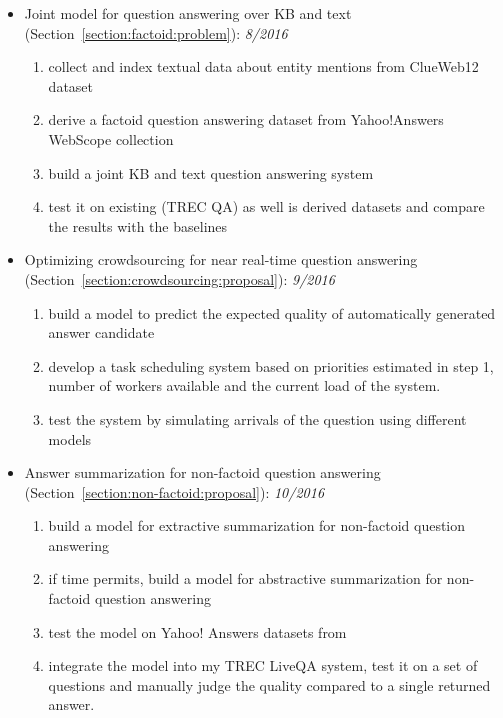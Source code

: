\begin{itemize}
\item Joint model for question answering over KB and text (Section~\ref{section:factoid:problem}): \textit{8/2016}
	\begin{enumerate}
	\item collect and index textual data about entity mentions from ClueWeb12 dataset
	\item derive a factoid question answering dataset from Yahoo!Answers WebScope collection
	\item build a joint KB and text question answering system
	\item test it on existing (TREC QA) as well is derived datasets and compare the results with the baselines
	\end{enumerate}
	
\item Optimizing crowdsourcing for near real-time question answering (Section~\ref{section:crowdsourcing:proposal}): \textit{9/2016}
	\begin{enumerate}
	\item build a model to predict the expected quality of automatically generated answer candidate
	\item develop a task scheduling system based on priorities estimated in step 1, number of workers available and the current load of the system.
	\item test the system by simulating arrivals of the question using different models
	\end{enumerate}

\item Answer summarization for non-factoid question answering (Section~\ref{section:non-factoid:proposal}): \textit{10/2016}
	\begin{enumerate}
	\item build a model for extractive summarization for non-factoid question answering
	\item if time permits, build a model for abstractive summarization for non-factoid question answering
	\item test the model on Yahoo! Answers datasets from~\cite{omari2016novelty,tomasoni2010metadata}
	\item integrate the model into my TREC LiveQA system, test it on a set of questions and manually judge the quality compared to a single returned answer.
	\end{enumerate}


\end{itemize}
